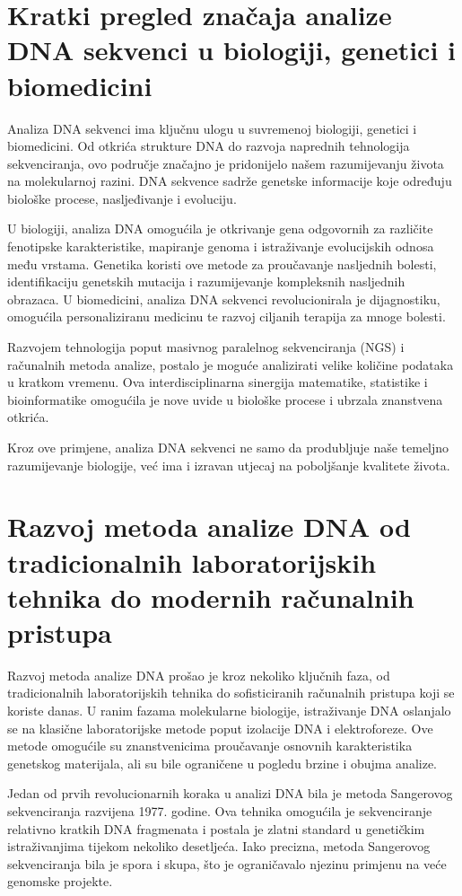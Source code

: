 \documentclass[10pt,a4paper,twoside]{article}
\begin{document}
	
	\section*{Kratki pregled značaja analize DNA sekvenci u biologiji, genetici i biomedicini}
	
	Analiza DNA sekvenci ima ključnu ulogu u suvremenoj biologiji, genetici i biomedicini. Od otkrića strukture DNA do razvoja naprednih tehnologija sekvenciranja, ovo područje značajno je pridonijelo našem razumijevanju života na molekularnoj razini. DNA sekvence sadrže genetske informacije koje određuju biološke procese, nasljeđivanje i evoluciju.
	
	U biologiji, analiza DNA omogućila je otkrivanje gena odgovornih za različite fenotipske karakteristike, mapiranje genoma i istraživanje evolucijskih odnosa među vrstama. Genetika koristi ove metode za proučavanje nasljednih bolesti, identifikaciju genetskih mutacija i razumijevanje kompleksnih nasljednih obrazaca. U biomedicini, analiza DNA sekvenci revolucionirala je dijagnostiku, omogućila personaliziranu medicinu te razvoj ciljanih terapija za mnoge bolesti.
	
	Razvojem tehnologija poput masivnog paralelnog sekvenciranja (NGS) i računalnih metoda analize, postalo je moguće analizirati velike količine podataka u kratkom vremenu. Ova interdisciplinarna sinergija matematike, statistike i bioinformatike omogućila je nove uvide u biološke procese i ubrzala znanstvena otkrića.
	
	Kroz ove primjene, analiza DNA sekvenci ne samo da produbljuje naše temeljno razumijevanje biologije, već ima i izravan utjecaj na poboljšanje kvalitete života.
	
	\section*{Razvoj metoda analize DNA od tradicionalnih laboratorijskih tehnika do modernih računalnih pristupa}
	
	Razvoj metoda analize DNA prošao je kroz nekoliko ključnih faza, od tradicionalnih laboratorijskih tehnika do sofisticiranih računalnih pristupa koji se koriste danas. U ranim fazama molekularne biologije, istraživanje DNA oslanjalo se na klasične laboratorijske metode poput izolacije DNA i elektroforeze. Ove metode omogućile su znanstvenicima proučavanje osnovnih karakteristika genetskog materijala, ali su bile ograničene u pogledu brzine i obujma analize.
	
	Jedan od prvih revolucionarnih koraka u analizi DNA bila je metoda Sangerovog sekvenciranja razvijena 1977. godine. Ova tehnika omogućila je sekvenciranje relativno kratkih DNA fragmenata i postala je zlatni standard u genetičkim istraživanjima tijekom nekoliko desetljeća. Iako precizna, metoda Sangerovog sekvenciranja bila je spora i skupa, što je ograničavalo njezinu primjenu na veće genomske projekte.
	
\end{document}
